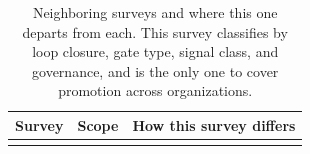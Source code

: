 \documentclass[
  11pt,
]{article}
\begin{document}
\begin{table}[htbp]
\caption{Neighboring surveys and where this one departs from each. This survey classifies by loop closure, gate type, signal class, and governance, and is the only one to cover promotion across organizations.}\label{tab:II-2}
\centering\small
\begin{tabular}{@{}
  >{\raggedright\arraybackslash}p{}
  >{\raggedright\arraybackslash}p{}
  >{\raggedright\arraybackslash}p{}@{}}
\toprule\noalign{}
\begin{minipage}[b]{\linewidth}\raggedright
Survey
\end{minipage} & \begin{minipage}[b]{\linewidth}\raggedright
Scope
\end{minipage} & \begin{minipage}[b]{\linewidth}\raggedright
How this survey differs
\end{minipage} \\
\midrule\noalign{}



\end{tabular}
\end{table}
\end{document}

